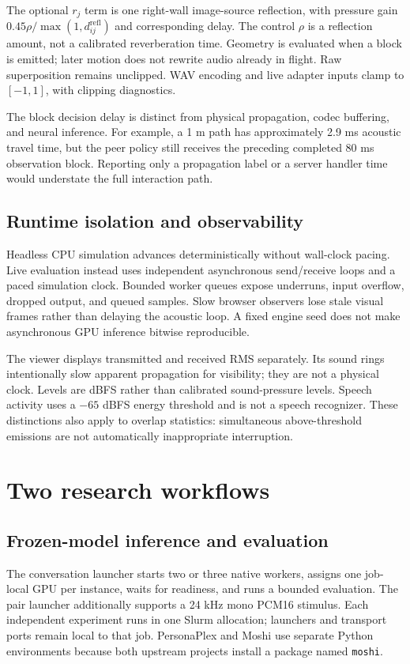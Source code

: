 \documentclass{article}
\newcommand{\code}[1]{\texttt{#1}}
\begin{document}
The optional $r_j$ term is one right-wall image-source reflection, with pressure gain $0.45\rho/\max(1,d^{\mathrm{refl}}_{ij})$ and corresponding delay. The control $\rho$ is a reflection amount, not a calibrated reverberation time. Geometry is evaluated when a block is emitted; later motion does not rewrite audio already in flight. Raw superposition remains unclipped. WAV encoding and live adapter inputs clamp to $[-1,1]$, with clipping diagnostics.

The block decision delay is distinct from physical propagation, codec buffering, and neural inference. For example, a 1 m path has approximately 2.9 ms acoustic travel time, but the peer policy still receives the preceding completed 80 ms observation block. Reporting only a propagation label or a server handler time would understate the full interaction path.

\subsection{Runtime isolation and observability}
Headless CPU simulation advances deterministically without wall-clock pacing. Live evaluation instead uses independent asynchronous send/receive loops and a paced simulation clock. Bounded worker queues expose underruns, input overflow, dropped output, and queued samples. Slow browser observers lose stale visual frames rather than delaying the acoustic loop. A fixed engine seed does not make asynchronous GPU inference bitwise reproducible.

The viewer displays transmitted and received RMS separately. Its sound rings intentionally slow apparent propagation for visibility; they are not a physical clock. Levels are dBFS rather than calibrated sound-pressure levels. Speech activity uses a $-65$ dBFS energy threshold and is not a speech recognizer. These distinctions also apply to overlap statistics: simultaneous above-threshold emissions are not automatically inappropriate interruption.

\section{Two research workflows}
\subsection{Frozen-model inference and evaluation}
The conversation launcher starts two or three native workers, assigns one job-local GPU per instance, waits for readiness, and runs a bounded evaluation. The pair launcher additionally supports a 24 kHz mono PCM16 stimulus. Each independent experiment runs in one Slurm allocation; launchers and transport ports remain local to that job. PersonaPlex and Moshi use separate Python environments because both upstream projects install a package named \code{moshi}.
\end{document}
